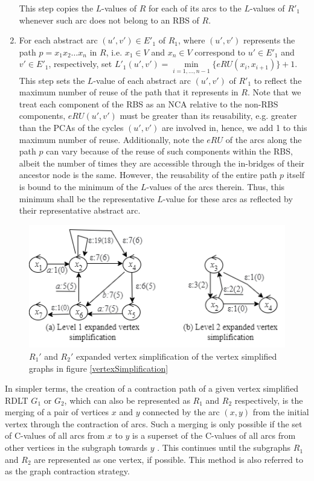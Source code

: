 \begin{algorithm}
\begin{enumerate}
        This step copies the $L$-values of $R$ for each of its arcs to the $L$-values of $R'_1$ whenever such arc does not belong to an RBS of $R$. 
        
        \item For each abstract arc $(u',v') \in E'_1$ of $R_1$, where $(u',v')$ represents the path \mbox{$p = x_1 x_2 \ldots x_n$} in $R$, i.e. $x_1 \in V$ and $x_n \in V$ correspond to $u' \in E'_1$ and  $v' \in E'_1$, respectively, set $L'_1(u',v') = \min\limits_{i = 1, \ldots, n-1} \{eRU(x_i, x_{i+1})\} + 1$. \\
        
        This step sets the $L$-value  of each abstract arc $(u',v')$ of $R'_1$ to reflect the maximum number of reuse of the path that it represents in $R$. Note that we treat each component of the RBS as an NCA relative to the non-RBS components, $eRU(u',v')$ must be greater than its reusability, e.g. greater than the PCAs of the cycles $(u',v')$ are involved in, hence, we add 1 to this maximum number of reuse. Additionally, note the $eRU$ of the arcs along the path $p$ can vary because of the reuse of such components within the RBS, albeit the number of times they are accessible through the in-bridges of their ancestor node is the same. However, the reusability of the entire path $p$ itself is bound to the minimum of the $L$-values of the arcs therein. Thus, this minimum shall be the representative $L$-value for these arcs as reflected by their representative abstract arc.
    \end{enumerate}
\end{algorithm}

\begin{figure}[H]
    \centering
    \includegraphics{../figures/expandedVertexSimplification.png}
    \caption{$R_1'$ and $R_2'$ expanded vertex simplification of the vertex simplified graphs in figure \ref{vertexSimplification}}
    \label{expandedVertexSimplifiedRLDTs}
\end{figure}
In simpler terms, the creation of a contraction path of a given vertex simplified RDLT $ G_1 $ or $ G_2 $, which can also be represented as $R_1$ and $R_2$ respectively, is the merging of a pair of vertices $ x $ and $ y $ connected by the arc $ (x,y) $ from the initial vertex through the contraction of arcs. Such a merging is only possible if the set of C-values of all arcs from $ x $ to $ y $ is a superset of the C-values of all arcs from other vertices in the subgraph towards $ y $ \cite{MalinaoWCTP2023}. This continues until the subgraphs $ R_1 $ and $ R_2 $ are represented as one vertex, if possible. This method is also referred to as the graph contraction strategy.

